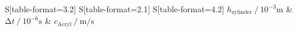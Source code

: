 \begin{table}
    \centering
    \caption{Bestimmung der Schallgeschwindigkeit mittels Impuls-Echo-Verfahren.}
    \label{tab:0}
    \begin{tabular}{
	S[table-format=3.2]
	S[table-format=2.1]
	S[table-format=4.2]
	}
	\toprule
	{$h_{\text{zylinder}} \:/\: 10^{-3} \si{\metre}$}		& {$\increment t \:/\: 10^{-6} \si{\second} $}		& 
	{$c_\text{Acryl} \:/\: \si{\metre\per\second} $}		\\ 
	\midrule
    
    \bottomrule
    \end{tabular}
    \end{table}
